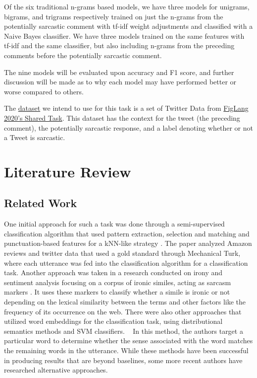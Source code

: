 \documentclass[11pt,a4paper]{article}
\begin{document}
Of the six traditional n-grams based models, we have three models for unigrams, bigrams, and trigrams respectively trained on just the n-grams from the potentially sarcastic comment 
with tf-idf \cite{Salton:86} weight adjustments and classified with a Naive Bayes classifier. 
We have three models trained on the same features with tf-idf and the same classifier, but also including n-grams from the preceding comments before the potentially sarcastic
comment.

The nine models will be evaluated upon accuracy and F1 score, and further discussion will be made as to why
each model may have performed better or worse compared
to others.

The \href{https://github.com/EducationalTestingService/sarcasm/releases}{dataset} we intend to use for this task is a set of Twitter Data from \href{https://sites.google.com/view/figlang2020/}{FigLang 2020's Shared Task}. This dataset has the context for the tweet (the preceding comment), the potentially sarcastic response, and a label denoting whether or not a Tweet is sarcastic.

\section{Literature Review}
\subsection{Related Work}

One initial approach for such a task was done through a semi-supervised classification algorithm that used pattern extraction, selection and matching and punctuation-based features
for a kNN-like strategy \cite{10.5555/1870568.1870582}. The paper analyzed Amazon reviews and twitter data that used a gold standard through Mechanical Turk, where each utterance
was fed into the classification algorithm for a classification task. Another approach was taken in a research conducted on irony and sentiment analysis focusing on a corpus of
ironic similes, acting as sarcasm markers \cite{Veale10detectingironic}. It uses these markers to classify whether a simile is ironic or not depending on the lexical similarity
between the terms and other factors like the frequency of its occurrence on the web. There were also other approaches that utilized word embeddings for the classification task,
using distributional semantics methods and SVM classifiers. ~\cite{Ghosh2015SarcasticON} In this method, the authors target a particular word to determine whether the sense
associated with the word matches the remaining words in the utterance. While these methods have been successful in producing results that are beyond baselines, some more recent
authors have researched alternative approaches. 
\end{document}

